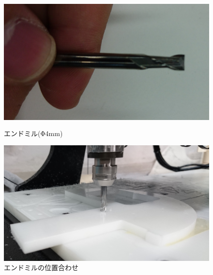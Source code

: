 \documentclass[b5paper, 9pt, twocolumn, titlepage,openany]{jsbook}%
\begin{document}
\begin{figure}[tbh]
  \begin{center}
    \begin{minipage}{0.7\columnwidth}
      \includegraphics[width=\columnwidth]{endmill_4mm_side.jpg}
    \end{minipage}
    \caption{エンドミル(Φ4mm\label{endmill_4mm})}
    \begin{minipage}{0.7\columnwidth}
      \includegraphics[width=\columnwidth]{endmill_push.jpg}
    \end{minipage}
    \caption{エンドミルの位置合わせ\label{push}}
  \end{center}
\end{figure}


\clearpage
\end{document}
